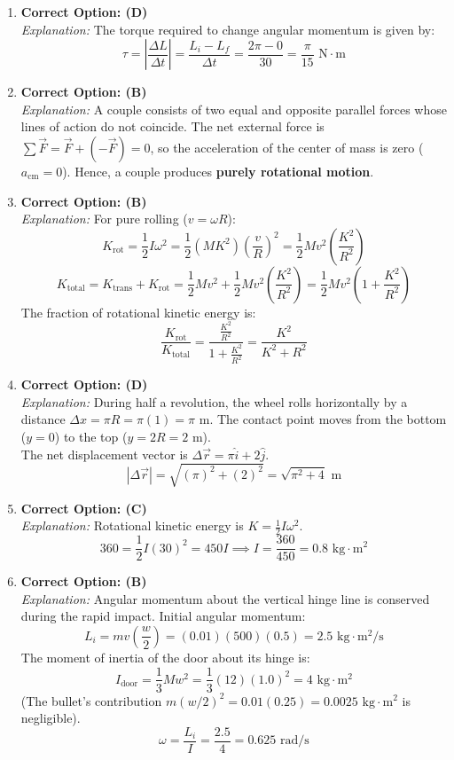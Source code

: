 \documentclass[11pt,a4paper]{article}
\begin{document}
\begin{enumerate}[label=\textbf{Q\arabic*.},leftmargin=24pt,itemsep=10pt]
  \item \textbf{Correct Option: (D)}\\
  \textit{Explanation:} The torque required to change angular momentum is given by:
  \[
    \tau = \left| \frac{\Delta L}{\Delta t} \right| = \frac{L_i - L_f}{\Delta t} = \frac{2\pi - 0}{30} = \frac{\pi}{15}\text{ N}\cdot\text{m}
  \]

  \item \textbf{Correct Option: (B)}\\
  \textit{Explanation:} A couple consists of two equal and opposite parallel forces whose lines of action do not coincide. The net external force is $\sum \vec{F} = \vec{F} + (-\vec{F}) = 0$, so the acceleration of the center of mass is zero ($a_{\text{cm}} = 0$). Hence, a couple produces \textbf{purely rotational motion}.

  \item \textbf{Correct Option: (B)}\\
  \textit{Explanation:} For pure rolling ($v = \omega R$):
  \[
    K_{\text{rot}} = \frac{1}{2} I \omega^2 = \frac{1}{2} (M K^2) \left(\frac{v}{R}\right)^2 = \frac{1}{2} M v^2 \left(\frac{K^2}{R^2}\right)
  \]
  \[
    K_{\text{total}} = K_{\text{trans}} + K_{\text{rot}} = \frac{1}{2} M v^2 + \frac{1}{2} M v^2 \left(\frac{K^2}{R^2}\right) = \frac{1}{2} M v^2 \left(1 + \frac{K^2}{R^2}\right)
  \]
  The fraction of rotational kinetic energy is:
  \[
    \frac{K_{\text{rot}}}{K_{\text{total}}} = \frac{\frac{K^2}{R^2}}{1 + \frac{K^2}{R^2}} = \frac{K^2}{K^2 + R^2}
  \]

  \item \textbf{Correct Option: (D)}\\
  \textit{Explanation:} During half a revolution, the wheel rolls horizontally by a distance $\Delta x = \pi R = \pi(1) = \pi\text{ m}$. The contact point moves from the bottom ($y = 0$) to the top ($y = 2R = 2\text{ m}$).\\
  The net displacement vector is $\Delta \vec{r} = \pi \hat{i} + 2 \hat{j}$.
  \[
    |\Delta \vec{r}| = \sqrt{(\pi)^2 + (2)^2} = \sqrt{\pi^2 + 4}\text{ m}
  \]

  \item \textbf{Correct Option: (C)}\\
  \textit{Explanation:} Rotational kinetic energy is $K = \frac{1}{2} I \omega^2$.
  \[
    360 = \frac{1}{2} I (30)^2 = 450 I \implies I = \frac{360}{450} = 0.8\text{ kg}\cdot\text{m}^2
  \]

  \item \textbf{Correct Option: (B)}\\
  \textit{Explanation:} Angular momentum about the vertical hinge line is conserved during the rapid impact. Initial angular momentum:
  \[
    L_i = m v \left(\frac{w}{2}\right) = (0.01)(500)(0.5) = 2.5\text{ kg}\cdot\text{m}^2/\text{s}
  \]
  The moment of inertia of the door about its hinge is:
  \[
    I_{\text{door}} = \frac{1}{3} M w^2 = \frac{1}{3}(12)(1.0)^2 = 4\text{ kg}\cdot\text{m}^2
  \]
  (The bullet's contribution $m(w/2)^2 = 0.01(0.25) = 0.0025\text{ kg}\cdot\text{m}^2$ is negligible).
  \[
    \omega = \frac{L_i}{I} = \frac{2.5}{4} = 0.625\text{ rad/s}
  \]


\end{enumerate}
\end{document}
